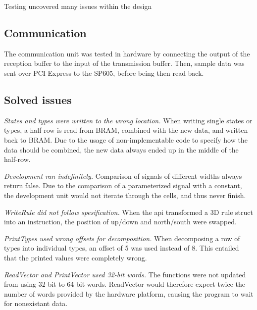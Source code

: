 



Testing uncovered many issues within the design

\subsection{Communication}

The communication unit was tested in hardware by connecting the output of the reception buffer to the input of the transmission buffer.
Then, sample data was sent over PCI Express to the SP605, before being then read back.

\subsection{Solved issues}

\emph{States and types were written to the wrong location.}
When writing single states or types, a half-row is read from BRAM, combined with the new data, and written back to BRAM.
Due to the usage of non-implementable code to specify how the data should be combined, the new data always ended up in the middle of the half-row.

\emph{Development ran indefinitely.}
Comparison of signals of different widths always return false.
Due to the comparison of a parameterized signal with a constant, the development unit would not iterate through the cells, and thus never finish.

\emph{WriteRule did not follow spesification.}
When the api transformed a 3D rule struct into an instruction, the position of up/down and north/south were swapped.

\emph{PrintTypes used wrong offsets for decomposition.}
When decomposing a row of types into individual types, an offset of 5 was used instead of 8.
This entailed that the printed values were completely wrong.

\emph{ReadVector and PrintVector used 32-bit words.}
The functions were not updated from using 32-bit to 64-bit words.
ReadVector would therefore expect twice the number of words provided by the hardware platform, causing the program to wait for nonexistant data.

